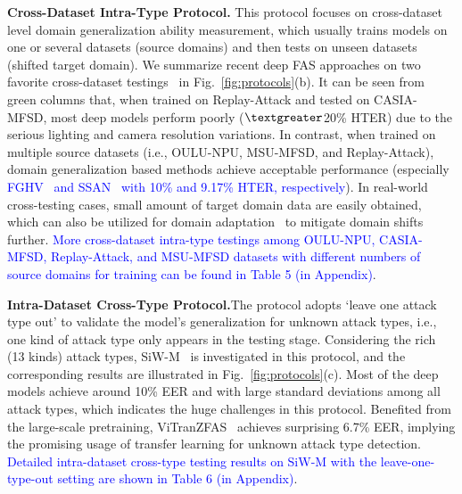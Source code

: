 \documentclass[10pt,journal,compsoc]{IEEEtran}
\begin{document}
\vspace{0.3em}

\noindent\textbf{Cross-Dataset Intra-Type Protocol.}\quad 
This protocol focuses on cross-dataset level domain generalization ability measurement, which usually trains models on one or several datasets (source domains) and then tests on unseen datasets (shifted target domain). We summarize recent deep FAS approaches on two favorite cross-dataset testings~\cite{yu2020searching,shao2019multi} in Fig.~\ref{fig:protocols}(b). It can be seen from green columns that, when trained on Replay-Attack and tested on CASIA-MFSD, most deep models perform poorly ($\textgreater$20\% HTER) due to the serious lighting and camera resolution variations. In contrast, when trained on multiple source datasets (i.e., OULU-NPU, MSU-MFSD, and Replay-Attack), domain generalization based methods achieve acceptable performance (especially \textcolor{blue}{FGHV~\cite{liu2022feature} and SSAN~\cite{wang2022domain} with 10\% and 9.17\% HTER, respectively}). In real-world cross-testing cases, small amount of target domain data are easily obtained, which can also be utilized for domain adaptation~\cite{jia2021unified} to mitigate domain shifts further. \textcolor{blue}{More cross-dataset intra-type testings among OULU-NPU, CASIA-MFSD, Replay-Attack, and MSU-MFSD datasets with different numbers of source domains for training can be found in Table 5 (in Appendix)}.  

\vspace{0.3em}

\noindent\textbf{Intra-Dataset Cross-Type Protocol.}\quad  The protocol adopts `leave one attack type out' to validate the model's generalization for unknown attack types, i.e., one kind of attack type only appears in the testing stage. Considering the rich (13 kinds) attack types, SiW-M~\cite{liu2019deep} is investigated in this protocol, and the corresponding results are illustrated in Fig.~\ref{fig:protocols}(c). Most of the deep models achieve around 10\% EER and with large standard deviations among all attack types, which indicates the huge challenges in this protocol. Benefited from the large-scale pretraining, ViTranZFAS~\cite{liu2019deep} achieves surprising 6.7\% EER, implying the promising usage of transfer learning for unknown attack type detection. \textcolor{blue}{Detailed intra-dataset cross-type testing results on SiW-M with the leave-one-type-out setting are shown in Table 6 (in Appendix)}.   



\vspace{0.4em}
\end{document}

